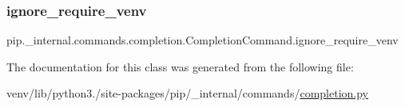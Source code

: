 \subsubsection{\texorpdfstring{ignore\+\_\+require\+\_\+venv}{ignore\_require\_venv}}
{\footnotesize\ttfamily pip.\+\_\+internal.\+commands.\+completion.\+Completion\+Command.\+ignore\+\_\+require\+\_\+venv\hspace{0.3cm}{\ttfamily [static]}}



The documentation for this class was generated from the following file\+:\begin{DoxyCompactItemize}
\item 
venv/lib/python3./site-\/packages/pip/\+\_\+internal/commands/\hyperlink{completion_8py}{completion.\+py}\end{DoxyCompactItemize}
